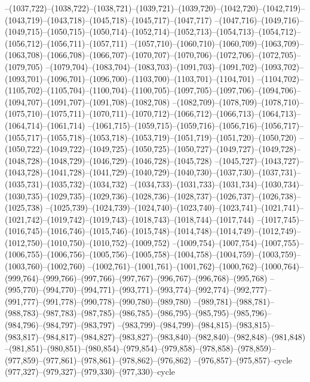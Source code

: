 --(1037,722)--(1038,722)--(1038,721)--(1039,721)--(1039,720)--(1042,720)--(1042,719)--(1043,719)--(1043,718)--(1045,718)--(1045,717)--(1047,717)
--(1047,716)--(1049,716)--(1049,715)--(1050,715)--(1050,714)--(1052,714)--(1052,713)--(1054,713)--(1054,712)--(1056,712)--(1056,711)--(1057,711)
--(1057,710)--(1060,710)--(1060,709)--(1063,709)--(1063,708)--(1066,708)--(1066,707)--(1070,707)--(1070,706)--(1072,706)--(1072,705)--(1079,705)
--(1079,704)--(1083,704)--(1083,703)--(1091,703)--(1091,702)--(1093,702)--(1093,701)--(1096,701)--(1096,700)--(1103,700)--(1103,701)--(1104,701)
--(1104,702)--(1105,702)--(1105,704)--(1100,704)--(1100,705)--(1097,705)--(1097,706)--(1094,706)--(1094,707)--(1091,707)--(1091,708)--(1082,708)
--(1082,709)--(1078,709)--(1078,710)--(1075,710)--(1075,711)--(1070,711)--(1070,712)--(1066,712)--(1066,713)--(1064,713)--(1064,714)--(1061,714)
--(1061,715)--(1059,715)--(1059,716)--(1056,716)--(1056,717)--(1055,717)--(1055,718)--(1053,718)--(1053,719)--(1051,719)--(1051,720)--(1050,720)
--(1050,722)--(1049,722)--(1049,725)--(1050,725)--(1050,727)--(1049,727)--(1049,728)--(1048,728)--(1048,729)--(1046,729)--(1046,728)--(1045,728)
--(1045,727)--(1043,727)--(1043,728)--(1041,728)--(1041,729)--(1040,729)--(1040,730)--(1037,730)--(1037,731)--(1035,731)--(1035,732)--(1034,732)
--(1034,733)--(1031,733)--(1031,734)--(1030,734)--(1030,735)--(1029,735)--(1029,736)--(1028,736)--(1028,737)--(1026,737)--(1026,738)--(1025,738)
--(1025,739)--(1024,739)--(1024,740)--(1023,740)--(1023,741)--(1021,741)--(1021,742)--(1019,742)--(1019,743)--(1018,743)--(1018,744)--(1017,744)
--(1017,745)--(1016,745)--(1016,746)--(1015,746)--(1015,748)--(1014,748)--(1014,749)--(1012,749)--(1012,750)--(1010,750)--(1010,752)--(1009,752)
--(1009,754)--(1007,754)--(1007,755)--(1006,755)--(1006,756)--(1005,756)--(1005,758)--(1004,758)--(1004,759)--(1003,759)--(1003,760)--(1002,760)
--(1002,761)--(1001,761)--(1001,762)--(1000,762)--(1000,764)--(999,764)--(999,766)--(997,766)--(997,767)--(996,767)--(996,768)--(995,768)
--(995,770)--(994,770)--(994,771)--(993,771)--(993,774)--(992,774)--(992,777)--(991,777)--(991,778)--(990,778)--(990,780)--(989,780)
--(989,781)--(988,781)--(988,783)--(987,783)--(987,785)--(986,785)--(986,795)--(985,795)--(985,796)--(984,796)--(984,797)--(983,797)
--(983,799)--(984,799)--(984,815)--(983,815)--(983,817)--(984,817)--(984,827)--(983,827)--(983,840)--(982,840)--(982,848)--(981,848)
--(981,851)--(980,851)--(980,854)--(979,854)--(979,858)--(978,858)--(978,859)--(977,859)--(977,861)--(978,861)--(978,862)--(976,862)
--(976,857)--(975,857)--cycle
(977,327)--(979,327)--(979,330)--(977,330)--cycle
